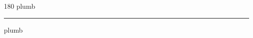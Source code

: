 
\begin{frame}
\begin{center}
\begin{turn}{180}
{\fontsize{2.5cm}{1em}\selectfont plumb}
\end{turn}
\vspace{1em}\par  
\hrule
\vspace{1em}\par  
{\fontsize{2.5cm}{1em}\selectfont plumb}
\end{center}
\end{frame}
